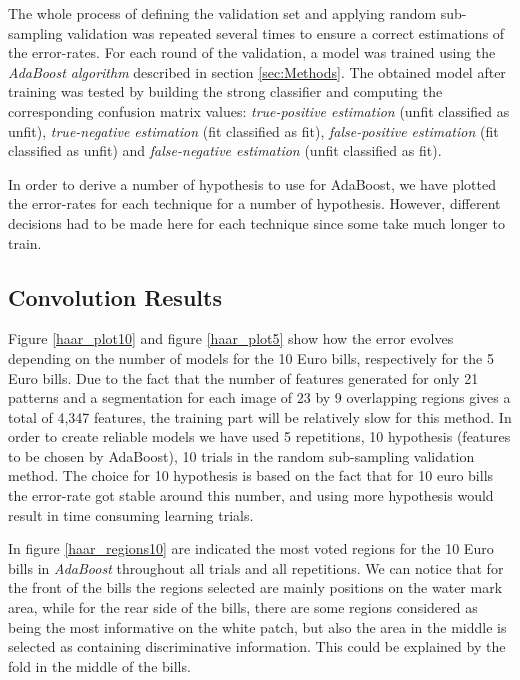 \documentclass[11pt,twocolumn]{article}
\begin{document}
		The whole process of defining the validation set and applying random sub-sampling validation was repeated several times to ensure a correct estimations of the error-rates. For each round of the validation, a model was trained using the \emph{AdaBoost algorithm} described in section \ref{sec:Methods}. The obtained model after training was tested by building the strong classifier and computing the corresponding confusion matrix values: \emph{true-positive estimation} (unfit classified as unfit), \emph{true-negative estimation} (fit classified as fit), \emph{false-positive estimation} (fit classified as unfit) and \emph{false-negative estimation} (unfit classified as fit).
		
		In order to derive a number of hypothesis to use for AdaBoost, we have plotted the error-rates for each technique for a number of hypothesis. However, different decisions had to be made here for each technique since some take much longer to train.

		\subsection{Convolution Results}\label{sec:haar_results}
		Figure \ref{haar_plot10} and figure \ref{haar_plot5} show how the error evolves depending on the number of models for the 10 Euro bills, respectively for the 5 Euro bills. Due to the fact that the number of features generated for only 21 patterns and a segmentation for each image of 23 by 9 overlapping regions gives a total of 4,347 features, the training part will be relatively slow for this method. In order to create reliable models we have used 5 repetitions, 10 hypothesis (features to be chosen by AdaBoost), 10 trials in the random sub-sampling validation method. The choice for 10 hypothesis is based on the fact that for 10 euro bills the error-rate got stable around this number, and using more hypothesis would result in time consuming learning trials.

		In figure \ref{haar_regions10} are indicated the most voted regions for the 10 Euro bills in \emph{AdaBoost} throughout all trials and all repetitions. We can notice that for the front of the bills the regions selected are mainly positions on the water mark area, while for the rear side of the bills, there are some regions considered as being the most informative on the white patch, but also the area in the middle is selected as containing discriminative information. This could be explained by the fold in the middle of the bills.
\end{document}

